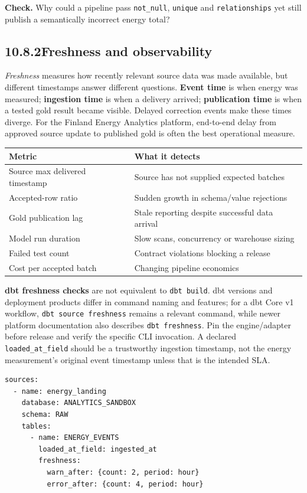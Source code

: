 \documentclass[11pt,twoside]{article}
\newcommand{\topic}[2]{\subsection*{#1\quad #2}}
\begin{document}
\textbf{Check.} Why could a pipeline pass \texttt{not\_null}, \texttt{unique} and \texttt{relationships} yet still publish a semantically incorrect energy total?
\newpage
\topic{10.8.2}{Freshness and observability}
\emph{Freshness} measures how recently relevant source data was made available, but different timestamps answer different questions. \textbf{Event time} is when energy was measured; \textbf{ingestion time} is when a delivery arrived; \textbf{publication time} is when a tested gold result became visible. Delayed correction events make these times diverge. For the Finland Energy Analytics platform, end-to-end delay from approved source update to published gold is often the best operational measure.
\begin{center}\renewcommand{\arraystretch}{1.12}\begin{tabularx}{\linewidth}{@{}p{39mm}X@{}}\toprule
\textbf{Metric}&\textbf{What it detects}\\\midrule
Source max delivered timestamp&Source has not supplied expected batches\\
Accepted-row ratio&Sudden growth in schema/value rejections\\
Gold publication lag&Stale reporting despite successful data arrival\\
Model run duration&Slow scans, concurrency or warehouse sizing\\
Failed test count&Contract violations blocking a release\\
Cost per accepted batch&Changing pipeline economics\\\bottomrule\end{tabularx}\end{center}
\textbf{dbt freshness checks} are not equivalent to \texttt{dbt build}. dbt versions and deployment products differ in command naming and features; for a dbt Core v1 workflow, \texttt{dbt source freshness} remains a relevant command, while newer platform documentation also describes \texttt{dbt freshness}. Pin the engine/adapter before release and verify the specific CLI invocation. A declared \texttt{loaded\_at\_field} should be a trustworthy ingestion timestamp, not the energy measurement's original event timestamp unless that is the intended SLA.
\begin{lstlisting}[caption={Illustrative source freshness declaration.}]
sources:
  - name: energy_landing
    database: ANALYTICS_SANDBOX
    schema: RAW
    tables:
      - name: ENERGY_EVENTS
        loaded_at_field: ingested_at
        freshness:
          warn_after: {count: 2, period: hour}
          error_after: {count: 4, period: hour}
\end{lstlisting}
\end{document}
